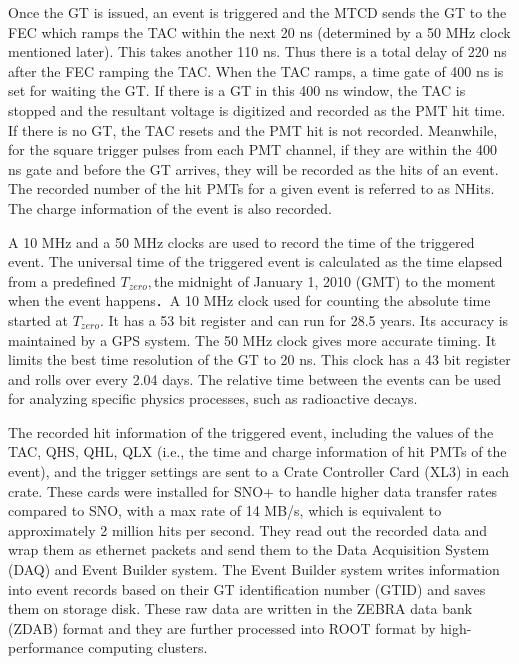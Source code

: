 Once the GT is issued, an event is triggered and the MTCD sends the GT to the FEC which ramps the TAC within the next 20 ns (determined by a 50 MHz clock mentioned later). This takes another 110 ns. Thus there is a total delay of 220 ns after the FEC ramping the TAC. When the TAC ramps, a time gate of 400 ns is set for waiting the GT. If there is a GT in this 400 ns window, the TAC is stopped and the resultant voltage is digitized and recorded as the PMT hit time. If there is no GT, the TAC resets and the PMT hit is not recorded. Meanwhile, for the square trigger pulses from each PMT channel, if they are within the 400 ns gate and before the GT arrives, they will be recorded as the hits of an event. The recorded number of the hit PMTs for a given event is referred to as NHits. The charge information of the event is also recorded\cite{stringer2019sensitivity,rattime}.

A 10 MHz and a 50 MHz clocks are used to record the time of the triggered event. The universal time of the triggered event is calculated as the time elapsed from a predefined $T_{zero}, $the midnight of January 1, 2010 (GMT) to the moment when the event happens．A 10 MHz clock used for counting the absolute time started at $T_{zero}$. It has a 53 bit register and can run for 28.5 years. Its accuracy is maintained by a GPS system. The 50 MHz clock gives more accurate timing. It limits the best time resolution of the GT to 20 ns. This clock has a 43 bit register and rolls over every 2.04 days. The relative time between the events can be used for analyzing specific physics processes, such as radioactive decays\cite{rattime,stringer2019sensitivity}. 

The recorded hit information of the triggered event, including the values of the TAC, QHS, QHL, QLX (i.e., the time and charge information of hit PMTs of the event), and the trigger settings are sent to a Crate Controller Card (XL3) in each crate. These cards were installed for SNO+ to handle higher data transfer rates compared to SNO, with a max rate of 14 MB/s, which is equivalent to approximately 2 million hits per second\cite{bonventre2014neutron}. They read out the recorded data and wrap them as ethernet packets and send them to the Data Acquisition System (DAQ) and Event Builder system\cite{walker2016study}. The Event Builder system writes information into event records based on their GT identification number (GTID) and saves them on storage disk\cite{snop_nim}. These raw data are written in the ZEBRA data bank (ZDAB) format and they are further processed into ROOT format by high-performance computing clusters.

